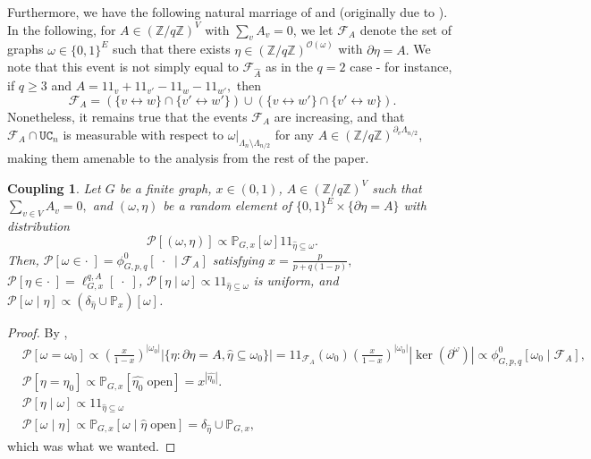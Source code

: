 \documentclass[article,11pt,reqno]{amsart}
\newcommand{\Z}{\mathbb{Z}}
\newcommand{\cc}{\leftrightarrow}
\newcommand{\id}{1\! \!1}
\newtheorem{coupling}[theorem]{Coupling}
\begin{document}
Furthermore, we have the following natural marriage of \cite[Theorem 3.2]{aizenman2019emergent} and \cite[Proposition 4.3]{hansen2025general} (originally due to \cite{zhang2020loop}). In the following, for $A\in (\mathbb{Z}/q\mathbb{Z})^V$ with $\sum_v A_v=0$, we let $\mathcal{F}_{A}$ denote the set of graphs $\omega\in \{0,1\}^E$ such that there exists $\eta\in (\mathbb{Z}/q\mathbb{Z})^{\mathcal{O}(\omega)}$ with $\partial \eta=A.$ We note that this event is not simply equal to $\mathcal{F}_{\widehat{A}}$ as in the $q=2$ case - for instance, if $q\geq 3$ and $A=\id_{v}+\id_{v'}-\id_{w}-\id_{w'},$ then 
$$
\mathcal{F}_{A}=\left(\{v\cc w\}\cap \{v'\cc w'\} \right)\cup \left(\{v\cc w'\}\cap \{v'\cc w\}\right).
$$
Nonetheless, it remains true that the events $\mathcal{F}_{A}$ are increasing, and that $\mathcal{F}_A \cap \mathtt{UC}_n$ is measurable with respect to $\omega\vert_{\Lambda_n \setminus \Lambda_{n/2}}$ for any $A \in (\Z/q\Z)^{\partial_v \Lambda_{n/2}}$, making them amenable to the analysis from the rest of the paper. 
\begin{coupling} \label{thm:The_q_Coupling}
Let $G$ be a finite graph, $x\in (0,1)$, $A\in (\mathbb{Z}/q\mathbb{Z})^{V}$ such that $\sum_{v\in V} A_v=0,$  and $(\omega,\eta)$ be a random element of $\{0,1\}^E\times \{\partial \eta=A\}$ with distribution
$$
\mathscr{P}[(\omega,\eta)]\propto \mathbb{P}_{G,x}[\omega]\id_{\hat{\eta}\subseteq \omega}.
$$
Then, $\mathscr{P}[\omega\in\cdot \;]=\phi^0_{G,p,q}[\;\cdot\; \mid \mathcal{F}_{A}]$ satisfying $x=\frac{p}{p+q(1-p)},$ $\mathscr{P}[\eta\in \cdot \;]=\ell^{q,A}_{G,x}[\;\cdot \;]$, $\mathscr{P}[\eta\mid \omega]\propto \id_{\hat{\eta}\subseteq \omega}$ is uniform, and $\mathscr{P}[\omega\mid \eta]\propto (\delta_{\hat{\eta}}\cup \mathbb{P}_{x})[\omega]$.
\end{coupling}

\begin{proof}
By \cite[Theorem 1.1]{hansen2025general}, 
\begin{align*}
&\mathscr{P}[\omega=\omega_0]\propto \left(\frac{x}{1-x}\right)^{|\omega_0|}|\{\eta : \partial\eta=A,\hat{\eta}\subseteq \omega_0\}|=\id_{\mathcal{F}_{A}}(\omega_0)\left(\frac{x}{1-x}\right)^{|\omega_0|}|\ker(\partial^{\omega})|\propto \phi^0_{G,p,q}[\omega_0\mid \mathcal{F}_{A}], \\
&\mathscr{P}[\eta=\eta_0]\propto \mathbb{P}_{G,x}[\widehat{\eta_0}\;\mathrm{ open}]=x^{|\hat{\eta_0}|}.\\
&\mathscr{P}[\eta\mid \omega]\propto \id_{\hat{\eta}\subseteq \omega}\\
&\mathscr{P}[\omega\mid \eta] \propto \mathbb{P}_{G,x}[\omega\mid \hat{\eta}\;\mathrm{open}]=\delta_{\hat{\eta}}\cup \mathbb{P}_{G,x},
\end{align*}
which was what we wanted.
\end{proof}
\end{document}
